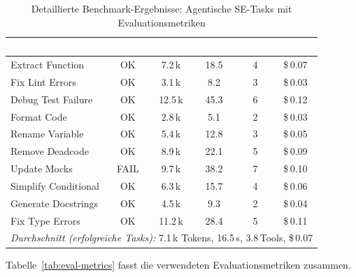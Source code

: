 \begin{table}[ht]
\centering
\caption{Detaillierte Benchmark-Ergebnisse: Agentische SE-Tasks mit Evaluationsmetriken}
\label{tab:benchmark-results}
\begin{tabularx}{\textwidth}{Xccccc}
\toprule
\cellcolor{headercolor}\textcolor{white}{\textbf{Aufgabe}} & \cellcolor{headercolor}\textcolor{white}{\textbf{Success}} & \cellcolor{headercolor}\textcolor{white}{\textbf{Token}} & \cellcolor{headercolor}\textcolor{white}{\textbf{Zeit (s)}} & \cellcolor{headercolor}\textcolor{white}{\textbf{Tools}} & \cellcolor{headercolor}\textcolor{white}{\textbf{Kosten}} \\
\midrule
Extract Function & OK & 7.2\,k & 18.5 & 4 & \$\,0.07 \\
\rowcolor{rowcolorgray}
Fix Lint Errors & OK & 3.1\,k & 8.2 & 3 & \$\,0.03 \\
Debug Test Failure & OK & 12.5\,k & 45.3 & 6 & \$\,0.12 \\
\rowcolor{rowcolorgray}
Format Code & OK & 2.8\,k & 5.1 & 2 & \$\,0.03 \\
Rename Variable & OK & 5.4\,k & 12.8 & 3 & \$\,0.05 \\
\rowcolor{rowcolorgray}
Remove Deadcode & OK & 8.9\,k & 22.1 & 5 & \$\,0.09 \\
Update Mocks & FAIL & 9.7\,k & 38.2 & 7 & \$\,0.10 \\
\rowcolor{rowcolorgray}
Simplify Conditional & OK & 6.3\,k & 15.7 & 4 & \$\,0.06 \\
Generate Docstrings & OK & 4.5\,k & 9.3 & 2 & \$\,0.04 \\
\rowcolor{rowcolorgray}
Fix Type Errors & OK & 11.2\,k & 28.4 & 5 & \$\,0.11 \\
\bottomrule
\multicolumn{6}{l}{\small \textit{Durchschnitt (erfolgreiche Tasks):} 7.1\,k Tokens, 16.5\,s, 3.8\,Tools, \$\,0.07} \\
\end{tabularx}
\end{table}

Tabelle~\ref{tab:eval-metrics} fasst die verwendeten Evaluationsmetriken zusammen.

